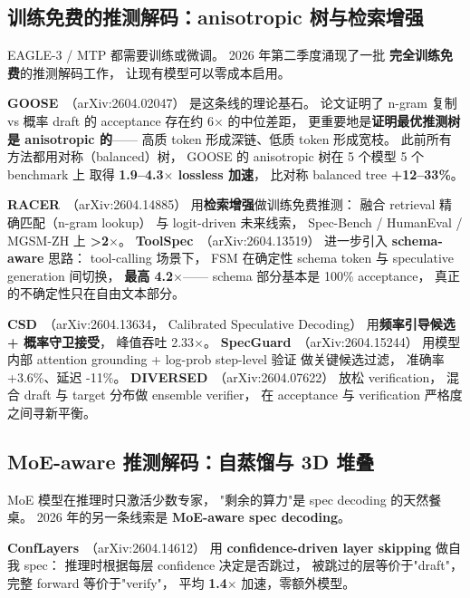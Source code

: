 \subsection{训练免费的推测解码：anisotropic 树与检索增强}
\label{sec:training-free-spec}

EAGLE-3 / MTP 都需要训练或微调。
2026 年第二季度涌现了一批
\textbf{完全训练免费}的推测解码工作，
让现有模型可以零成本启用。

\textbf{GOOSE}~\cite{goose2026}（arXiv:2604.02047）
是这条线的理论基石。
论文证明了 n-gram 复制 vs 概率 draft 的 acceptance
存在约 6$\times$ 的中位差距，
更重要地是\textbf{证明最优推测树是 anisotropic 的}——
高质 token 形成深链、低质 token 形成宽枝。
此前所有方法都用对称（balanced）树，
GOOSE 的 anisotropic 树在 5 个模型 5 个 benchmark 上
取得 \textbf{1.9--4.3$\times$ lossless 加速}，
比对称 balanced tree \textbf{+12--33\%}。

\textbf{RACER}~\cite{racer2026}（arXiv:2604.14885）
用\textbf{检索增强}做训练免费推测：
融合 retrieval 精确匹配（n-gram lookup）
与 logit-driven 未来线索，
Spec-Bench / HumanEval / MGSM-ZH 上 \textbf{>2$\times$}。
\textbf{ToolSpec}~\cite{toolspec2026}（arXiv:2604.13519）
进一步引入 \textbf{schema-aware} 思路：
tool-calling 场景下，
FSM 在确定性 schema token 与 speculative generation 间切换，
\textbf{最高 4.2$\times$}——
schema 部分基本是 100\% acceptance，
真正的不确定性只在自由文本部分。

\textbf{CSD}~\cite{csd2026}（arXiv:2604.13634，
Calibrated Speculative Decoding）
用\textbf{频率引导候选 + 概率守卫接受}，
峰值吞吐 2.33$\times$。
\textbf{SpecGuard}~\cite{specguard2026}（arXiv:2604.15244）
用模型内部 attention grounding + log-prob step-level 验证
做关键候选过滤，
准确率 +3.6\%、延迟 -11\%。
\textbf{DIVERSED}~\cite{diversed2026}（arXiv:2604.07622）
放松 verification，
混合 draft 与 target 分布做 ensemble verifier，
在 acceptance 与 verification 严格度之间寻新平衡。

\subsection{MoE-aware 推测解码：自蒸馏与 3D 堆叠}
\label{sec:moe-spec}

MoE 模型在推理时只激活少数专家，
"剩余的算力"是 spec decoding 的天然餐桌。
2026 年的另一条线索是
\textbf{MoE-aware spec decoding}。

\textbf{ConfLayers}~\cite{conflayers2026}（arXiv:2604.14612）
用 \textbf{confidence-driven layer skipping} 做自我 spec：
推理时根据每层 confidence 决定是否跳过，
被跳过的层等价于"draft"，
完整 forward 等价于"verify"，
平均 \textbf{1.4$\times$} 加速，零额外模型。


